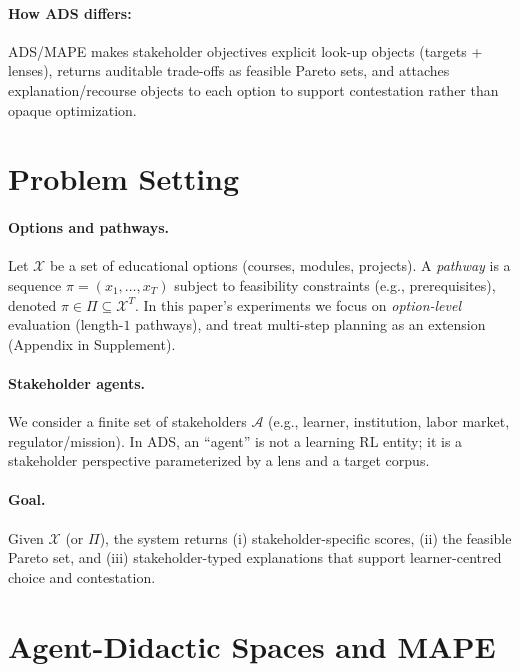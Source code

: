 \documentclass{article}
\newcommand{\ADS}{\textsc{ADS}\xspace}
\newcommand{\MAPE}{\textsc{MAPE}\xspace}
\begin{document}
\paragraph{How ADS differs:} \ADS/\MAPE makes stakeholder objectives explicit look-up objects (targets + lenses), returns auditable trade-offs as feasible Pareto sets, and attaches explanation/recourse objects to each option to support contestation rather than opaque optimization.

\section{Problem Setting}
\label{sec:setting}
\paragraph{Options and pathways.}
Let $\mathcal{X}$ be a set of educational options (courses, modules, projects). A \emph{pathway} is a sequence $\pi=(x_1,\dots,x_T)$ subject to feasibility constraints (e.g., prerequisites), denoted $\pi\in\Pi\subseteq\mathcal{X}^T$. In this paper's experiments we focus on \emph{option-level} evaluation (length-$1$ pathways), and treat multi-step planning as an extension (Appendix in Supplement).

\paragraph{Stakeholder agents.}
We consider a finite set of stakeholders $\mathcal{A}$ (e.g., learner, institution, labor market, regulator/mission). In \ADS, an ``agent'' is not a learning RL entity; it is a stakeholder perspective parameterized by a lens and a target corpus.

\paragraph{Goal.}
Given $\mathcal{X}$ (or $\Pi$), the system returns (i) stakeholder-specific scores, (ii) the feasible Pareto set, and (iii) stakeholder-typed explanations that support learner-centred choice and contestation.

\section{Agent-Didactic Spaces and \MAPE}
\label{sec:method}
\end{document}
